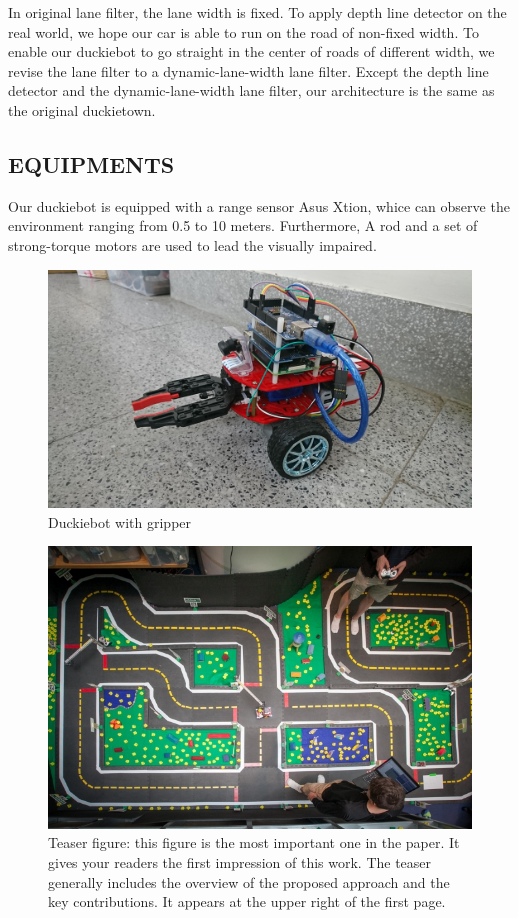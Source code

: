 \documentclass[letterpaper, 10 pt, conference]{ieeeconf}  %
\begin{document}
In original lane filter, the lane width is fixed. To apply depth line detector on the real world, we hope our car is able to run on the road of non-fixed width. To enable our duckiebot to go straight in the center of roads of different width, we revise the lane filter to a dynamic-lane-width lane filter. Except the depth line detector and the dynamic-lane-width lane filter, our architecture is the same as the original duckietown.


\subsection{EQUIPMENTS} 

Our duckiebot is equipped with a range sensor Asus Xtion, whice can observe the environment ranging from 0.5 to 10 meters. Furthermore, A rod and a set of strong-torque motors are used to lead the visually impaired.
\begin{figure}[h] %
\includegraphics[width=0.8\columnwidth]{duckiebot_gripper}
\centering
\caption{Duckiebot with gripper}
 \label{figure:duckiebot_gripper}
\end{figure}

\begin{figure}[t] %
\includegraphics[width=0.8\columnwidth]{duck}
\centering
\caption{Teaser figure: this figure is the most important one in the paper. It gives your readers the first impression of this work. The teaser generally includes the overview of the proposed approach and the key contributions. It appears at the upper right of the first page.}
\end{figure}
\end{document}
